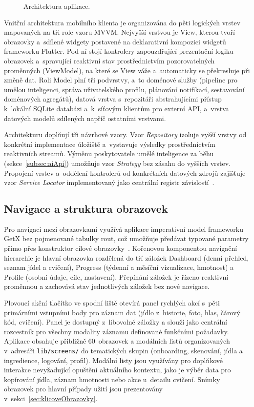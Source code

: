 \begin{figure}[!htb]
	\centering
	\resizebox{\textwidth}{!}{}
	\caption{Architektura aplikace.}
	\label{fig:architektura}
\end{figure}

Vnitřní architektura mobilního klienta je organizována do pěti logických vrstev mapovaných na tři role vzoru MVVM.
Nejvyšší vrstvou je View, kterou tvoří obrazovky a~sdílené widgety postavené na deklarativní kompozici widgetů frameworku Flutter.
Pod ní stojí kontrolery zapouzdřující prezentační logiku obrazovek a~spravující reaktivní stav prostřednictvím pozorovatelných proměnných (ViewModel), na které se View váže a~automaticky se překresluje při změně dat.
Roli Model plní tři podvrstvy, a~to doménové služby (pipeline pro umělou inteligenci, správa uživatelského profilu, plánování notifikací, sestavování doménových agregátů), datová vrstva s~repozitáři abstrahujícími přístup k~lokální SQLite databázi a~k~síťovým klientům pro externí API, a~vrstva datových modelů sdílených napříč ostatními vrstvami.

Architekturu doplňují tři návrhové vzory.
Vzor \emph{Repository} izoluje vyšší vrstvy od konkrétní implementace úložiště a~vystavuje výsledky prostřednictvím reaktivních streamů.
Výměnu poskytovatele umělé inteligence za běhu (sekce~\ref{subsec:aiApi}) umožňuje vzor \emph{Strategy} bez zásahu do vyšších vrstev.
Propojení vrstev a~oddělení kontrolerů od konkrétních datových zdrojů zajišťuje vzor \emph{Service Locator} implementovaný jako centrální registr závislostí~\cite{flutterDoc}.

\subsection{Navigace a struktura obrazovek}
\label{subsec:navigace}

Pro navigaci mezi obrazovkami využívá aplikace imperativní model frameworku GetX bez pojmenované tabulky rout, což umožňuje předávat typované parametry přímo přes konstruktor cílové obrazovky~\cite{getxDoc}.
Kořenovou komponentou navigační hierarchie je hlavní obrazovka rozdělená do tří záložek Dashboard (denní přehled, seznam jídel a cvičení), Progress (týdenní a měsíční vizualizace, hmotnost) a Profile (osobní údaje, cíle, nastavení).
Přepínání záložek je řízeno reaktivní proměnnou a zachovává stav jednotlivých záložek bez nové navigace.

Plovoucí akční tlačítko ve spodní liště otevírá panel rychlých akcí s~pěti primárními vstupními body pro záznam dat (jídlo z~historie, foto, hlas, čárový kód, cvičení).
Panel je dostupný z~libovolné záložky a slouží jako centrální rozcestník pro všechny modality záznamu definované funkčními požadavky.
Aplikace obsahuje přibližně 60~obrazovek a modálních listů organizovaných v~adresáři \texttt{lib/screens/} do tematických skupin (onboarding, skenování, jídla a ingredience, logování, profil).
Modální listy jsou využívány pro doplňkové interakce nevyžadující opuštění aktuálního kontextu, jako je výběr data pro kopírování jídla, záznam hmotnosti nebo akce u~detailu cvičení.
Snímky obrazovek pro hlavní případy užití jsou prezentovány v~sekci~\ref{sec:klicoveObrazovky}.


